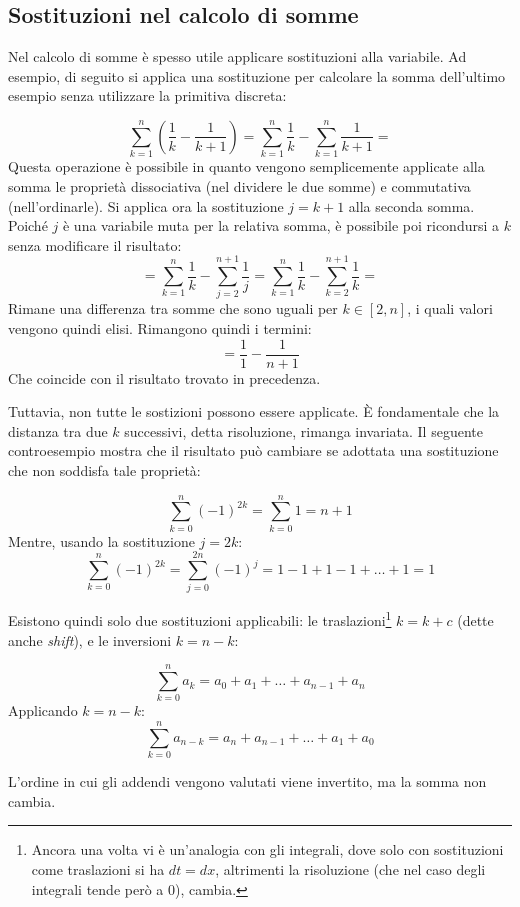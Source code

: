 \subsection{Sostituzioni nel calcolo di somme}
Nel calcolo di somme è spesso utile applicare sostituzioni alla variabile. Ad esempio, di seguito si applica una sostituzione per calcolare la somma dell'ultimo esempio senza utilizzare la primitiva discreta:
\begin{examp}
	\[
		\sum_{k=1}^n\left(\frac{1}{k}-\frac{1}{k+1}\right)=\sum_{k=1}^n\frac{1}{k}-\sum_{k=1}^n\frac{1}{k+1}=
	\]
	Questa operazione è possibile in quanto vengono semplicemente applicate alla somma le proprietà dissociativa (nel dividere le due somme) e commutativa (nell'ordinarle). Si applica ora la sostituzione $j=k+1$ alla seconda somma. Poiché $j$ è una variabile muta per la relativa somma, è possibile poi ricondursi a $k$ senza modificare il risultato:
	\[
		=\sum_{k=1}^n\frac{1}{k}-\sum_{j=2}^{n+1}\frac{1}{j}=\sum_{k=1}^n\frac{1}{k}-\sum_{k=2}^{n+1}\frac{1}{k}=
	\]
	Rimane una differenza tra somme che sono uguali per $k\in[2,n]$, i quali valori vengono quindi elisi. Rimangono quindi i termini:
	\[
		=\frac{1}{1}-\frac{1}{n+1}
	\]
	Che coincide con il risultato trovato in precedenza.
\end{examp}

Tuttavia, non tutte le sostizioni possono essere applicate. È fondamentale che la distanza tra due $k$ successivi, detta risoluzione, rimanga invariata. Il seguente controesempio mostra che il risultato può cambiare se adottata una sostituzione che non soddisfa tale proprietà:
\begin{examp}
	\[
		\sum_{k=0}^n (-1)^{2k}=\sum_{k=0}^n 1 = n+1
	\]
	Mentre, usando la sostituzione $j=2k$:
	\[
		\sum_{k=0}^n (-1)^{2k}=\sum_{j=0}^{2n}(-1)^j=1-1+1-1+\dots+1=1
	\]
\end{examp}
Esistono quindi solo due sostituzioni applicabili: le traslazioni\footnote{Ancora una volta vi è un'analogia con gli integrali, dove solo con sostituzioni come traslazioni si ha $dt=dx$, altrimenti la risoluzione (che nel caso degli integrali tende però a $0$), cambia.} $k=k+c$ (dette anche \emph{shift}), e le inversioni $k=n-k$:
\begin{examp}
	\[
		\sum_{k=0}^n a_k=a_0+a_1+\dots+a_{n-1}+a_n
	\]
	Applicando $k=n-k$:
	\[
		\sum_{k=0}^n a_{n-k}=a_n+a_{n-1}+\dots+a_1+a_0
	\]
\end{examp}
L'ordine in cui gli addendi vengono valutati viene invertito, ma la somma non cambia.


